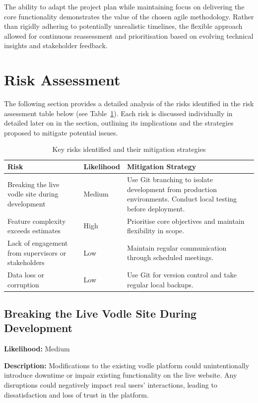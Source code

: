 The ability to adapt the project plan while maintaining focus on delivering the core functionality demonstrates the value of the chosen agile methodology. Rather than rigidly adhering to potentially unrealistic timelines, the flexible approach allowed for continuous reassessment and prioritisation based on evolving technical insights and stakeholder feedback.
\section{Risk Assessment}
The following section provides a detailed analysis of the risks identified in the risk assessment table below (see Table~\ref{tab:risk-assessment}). Each risk is discussed individually in detailed later on in the section, outlining its implications and the strategies proposed to mitigate potential issues.

\begin{table}[H]
\centering
\begin{tabular}{|p{4.5cm}|p{2cm}|p{8cm}|}
\hline
\textbf{Risk} & \textbf{Likelihood} & \textbf{Mitigation Strategy} \\
\hline
Breaking the live vodle site during development & Medium & Use Git branching to isolate development from production environments. Conduct local testing before deployment. \\
\hline
Feature complexity exceeds estimates & High & Prioritise core objectives and maintain flexibility in scope. \\
\hline
Lack of engagement from supervisors or stakeholders & Low & Maintain regular communication through scheduled meetings. \\
\hline
Data loss or corruption & Low & Use Git for version control and take regular local backups. \\
\hline
\end{tabular}
\caption{Key risks identified and their mitigation strategies}\label{tab:risk-assessment}
\end{table}

\subsection*{Breaking the Live Vodle Site During Development}

\textbf{Likelihood:} Medium

\textbf{Description:} Modifications to the existing vodle platform could unintentionally introduce downtime or impair existing functionality on the live website. Any disruptions could negatively impact real users' interactions, leading to dissatisfaction and loss of trust in the platform.


